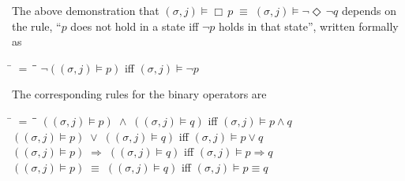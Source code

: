 \documentclass[12pt, fleqn, leqno]{article}
\newcommand{\mymathindent}{24pt}                    %
\newcommand{\equivs}{\ensuremath{\;\equiv\;}}       %
\newcommand{\impl}{\ensuremath{\Rightarrow}}        %
\newcommand{\Event}{\Diamond\,}
\newcommand{\Always}{\Box\,}
\newcommand{\myqedtab}{\hspace{384pt}}              %
\begin{document}
The above demonstration that $(\sigma, j) \models \Always p \equivs (\sigma, j) \models \neg \Event \neg q$ depends on the
rule, ``$p$ does not hold in a state iff $\neg p$ holds in that state'', written formally as
\begin{tabbing}
\hspace{\mymathindent} \= $= \;$ \= \myqedtab \= \kill
  \> $\neg ((\sigma, j) \models p)$ \quad iff \quad $(\sigma, j) \models \neg p$
\end{tabbing}
The corresponding rules for the binary operators are
\begin{tabbing}
\hspace{\mymathindent} \= $= \;$ \= \myqedtab \= \kill
  \> $((\sigma, j) \models p) \;\land\; ((\sigma, j) \models q)$ \quad iff \quad $(\sigma, j) \models p\land q$\\
  \> $((\sigma, j) \models p) \;\lor\; ((\sigma, j) \models q)$ \quad iff \quad $(\sigma, j) \models p\lor q$\\
  \> $((\sigma, j) \models p) \;\impl\; ((\sigma, j) \models q)$ \quad iff \quad $(\sigma, j) \models p \impl q$\\
  \> $((\sigma, j) \models p) \;\equiv\; ((\sigma, j) \models q)$ \quad iff \quad $(\sigma, j) \models p \equiv q$
\end{tabbing}
\end{document}
